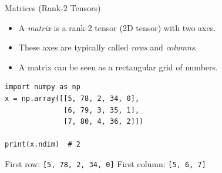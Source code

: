 \documentclass{beamer}
\begin{document}
\begin{frame}[fragile]{Matrices (Rank-2 Tensors)}
    \begin{itemize}
        \item A \textit{matrix} is a rank-2 tensor (2D tensor) with two axes.
        \item These axes are typically called \textit{rows} and \textit{columns}.
        \item A matrix can be seen as a rectangular grid of numbers.
    \end{itemize}

    \begin{center}
        \begin{tcolorbox}[
                width=0.7\textwidth,
                colback=gray!5,
                colframe=gray!60,
                boxrule=0.4pt,
                arc=3pt,
                left=6pt,right=6pt,top=6pt,bottom=6pt
            ]
            \begin{verbatim}
import numpy as np
x = np.array([[5, 78, 2, 34, 0],
              [6, 79, 3, 35, 1],
              [7, 80, 4, 36, 2]])

print(x.ndim)  # 2
\end{verbatim}
        \end{tcolorbox}
    \end{center}

    \vspace{0.5em}
    \small First row: \texttt{[5, 78, 2, 34, 0]} \quad
    First column: \texttt{[5, 6, 7]}
\end{frame}
\end{document}
